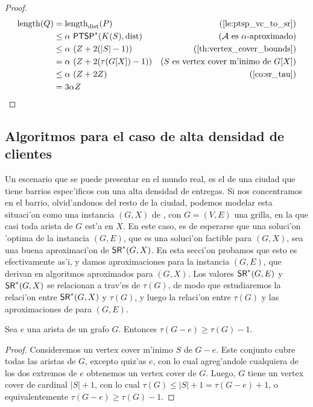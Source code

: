 \begin{theorem}
\begin{proof}
\begin{align*}
\length(Q) &= \length_{\dist}(P) & \text{(\autoref{le:ptsp_vc_to_sr})}\\
&\leq \alpha \text{ } \problem{PTSP}^*(K(S), \dist) & \text{(} \mathcal{A} \text{ es } \alpha \text{-aproximado)}\\
&\leq \alpha \text{ } (Z + 2(|S| - 1)) & \text{(\autoref{th:vertex_cover_bounds})}\\
&= \alpha \text{ } (Z + 2(\tau(G[X]) - 1)) & \text{(} S \text{ es vertex cover m'inimo de } G[X] \text{)}\\
&\leq \alpha \text{ } (Z + 2Z) & \text{(\autoref{co:sr_tau})}\\
&= 3\alpha Z
\end{align*}

\end{proof}
\end{theorem}

\subsection{Algoritmos para el caso de alta densidad de clientes}

Un escenario que se puede presentar en el mundo real, es el de una ciudad que tiene barrios espec'ificos con una alta densidad de entregas. Si nos concentramos en el barrio, olvid'andonos del resto de la ciudad, podemos modelar esta situaci'on como una instancia $(G, X)$ de , con $G = (V, E)$ una grilla, en la que casi toda arista de $G$ est'a en $X$. En este caso, es de esperarse que una soluci'on 'optima de la instancia $(G, E)$, que es una soluci'on factible para $(G, X)$, sea una buena aproximaci'on de $\textnormal{\textsf{SR}}^*(G, X)$. En esta secci'on probamos que esto es efectivamente as'i, y damos aproximaciones para la instancia $(G, E)$, que derivan en algoritmos aproximados para $(G, X)$. Los valores $\textnormal{\textsf{SR}}^*(G, E)$ y $\textnormal{\textsf{SR}}^*(G, X)$ se relacionan a trav'es de $\tau(G)$, de modo que estudiaremos la relaci'on entre $\textnormal{\textsf{SR}}^*(G, X)$ y $\tau(G)$, y luego la relaci'on entre $\tau(G)$ y las aproximaciones de  para $(G, E)$.

\begin{lemma}
\label{le:tau_g_menos_e}
Sea $e$ una arista de un grafo $G$. Entonces $\tau(G - e) \geq \tau(G) - 1$.

\begin{proof}
Consideremos un vertex cover m'inimo $S$ de $G - e$. Este conjunto cubre todas las aristas de $G$, excepto quiz'as $e$, con lo cual agreg'andole cualquiera de los dos extremos de $e$ obtenemos un vertex cover de $G$. Luego, $G$ tiene un vertex cover de cardinal $|S| + 1$, con lo cual $\tau(G) \leq |S| + 1 = \tau(G - e) + 1$, o equivalentemente $\tau(G - e) \geq \tau(G) - 1$.
\end{proof}
\end{lemma}

